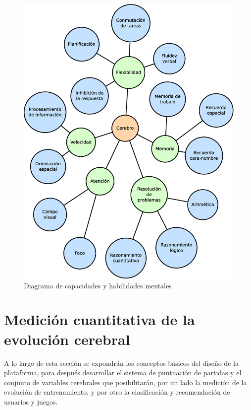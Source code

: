 \begin{figure}[H]
  \begin{center}
    \includegraphics[scale=0.48]{images/games-diagram-esp.eps}
    \caption{Diagrama de capacidades y habilidades mentales}
    \label{fig::habilidades}
  \end{center}
\end{figure}


\section{Medición cuantitativa de la evolución cerebral}

A lo largo de esta sección se expondrán los conceptos básicos del diseño de la plataforma, para después desarrollar el sistema de puntuación de partidas y el conjunto de variables cerebrales que posibilitarán, por un lado la medición de la evolución de entrenamiento, y por otro la clasificación y recomendación de usuarios y juegos.

